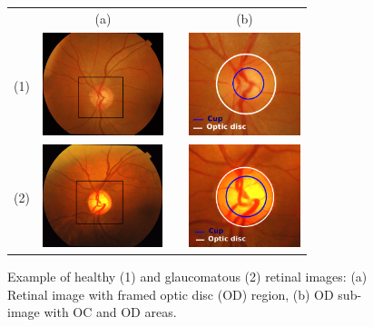 \begin{figure}[t]
    \centering
    
    \begin{tabular}{c c c c}
    {} & (a) & {} & (b) \\
    (1) & \includegraphics[height=3.0cm]{Images/Introduction/image1.png} & {} & \includegraphics[height=3.0cm]{Images/Introduction/image1_zones.png} \\
    
    (2) & \includegraphics[height=3.0cm]{Images/Introduction/image2} & {} & \includegraphics[height=3.0cm]{Images/Introduction/image2_zones.png} \\
    \end{tabular}

    \caption{Example of healthy (1) and glaucomatous (2) retinal images: (a) Retinal image with framed optic disc (OD) region, (b) OD sub-image with OC and OD areas.}
    \label{Example}
    
\end{figure}


